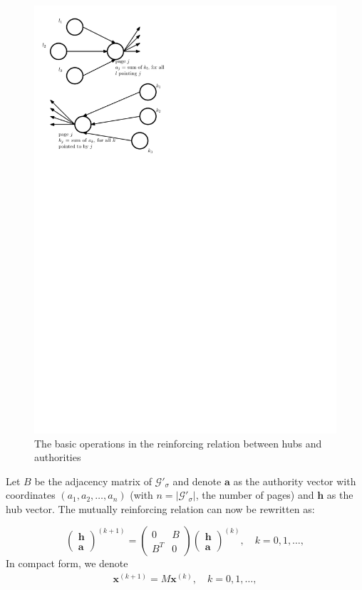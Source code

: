\documentclass[a4paper,11pt]{report}
\newcommand{\graf}{\mathscr{G}}
\begin{document}
\begin{figure}[h!]
  \centering
  \includegraphics[scale=1]{fig2hits.pdf}\caption{The basic operations in the reinforcing relation between hubs and authorities}\label{reinforcing}
\end{figure}

Let $B$ be the adjacency matrix of $\graf'_\sigma$ and denote $\mathbf{a}$ as the authority vector with coordinates $(a_1,a_2,\ldots,a_n)$ (with $n = 
 |\graf'_\sigma|$, the number of pages) and $\mathbf{h}$ as the hub vector. The mutually reinforcing relation can now be rewritten 
as:

$$\begin{pmatrix} 
\textbf{h}\\
\textbf{a}
\end{pmatrix}^{(k+1)} = \begin{pmatrix} 
0 & B\\
B^T & 0
\end{pmatrix} \begin{pmatrix} 
\textbf{h}\\
\textbf{a}
\end{pmatrix}^{(k)},\quad k = 0, 1,\ldots,$$
In compact form, we denote
\begin{eqnarray}\label{compactform}
  \mathbf{x}^{(k+1)} = M\mathbf{x}^{(k)},\quad k = 0, 1,\ldots,
\end{eqnarray}
\end{document}
